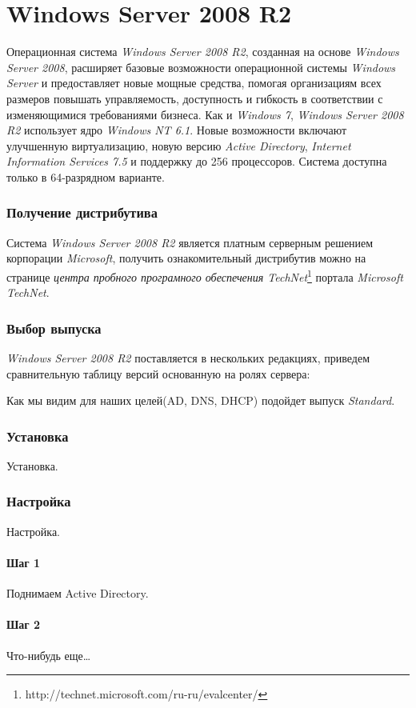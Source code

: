 \part{Windows Server 2008 R2}
Операционная система \textit{Windows Server 2008 R2}, созданная на основе \textit{Windows Server 2008}, расширяет базовые возможности операционной системы \textit{Windows Server} и предоставляет новые мощные средства, помогая организациям всех размеров повышать управляемость, доступность и гибкость в соответствии с изменяющимися требованиями бизнеса.
Как и \textit{Windows 7}, \textit{Windows Server 2008 R2} использует ядро \textit{Windows NT 6.1}.
Новые возможности включают улучшенную виртуализацию, новую версию \textit{Active Directory}, \textit{Internet Information Services 7.5} и поддержку до 256 процессоров. Система доступна только в 64-разрядном варианте.

\section{Получение дистрибутива}
Система \textit{Windows Server 2008 R2} является платным серверным решением корпорации \textit{Microsoft}, получить ознакомительный дистрибутив можно на странице \textit{центра пробного програмного обеспечения TechNet}\footnote{http://technet.microsoft.com/ru-ru/evalcenter/} портала \textit{Microsoft TechNet}.

\section{Выбор выпуска}
\textit{Windows Server 2008 R2} поставляется в нескольких редакциях, приведем сравнительную таблицу версий основанную на ролях сервера:
\begin{figure}[H]
\end{figure}
Как мы видим для наших целей(AD, DNS, DHCP) подойдет выпуск \textit{Standard}.

\section{Установка}
Установка.

\section{Настройка}
Настройка.

\subsection{Шаг 1}
Поднимаем Active Directory.

\subsection{Шаг 2}
Что-нибудь еще\ldots